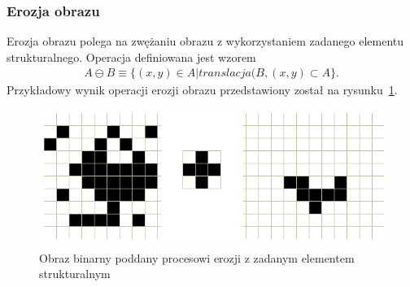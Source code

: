 \subsubsection{Erozja obrazu} 
Erozja obrazu polega na zwężaniu obrazu z wykorzystaniem zadanego elementu strukturalnego. Operacja definiowana jest wzorem
\begin{gather*}
  A \ominus B \equiv \{ (x, y) \in A | translacja(B, (x, y) \subset A \}.
\end{gather*}
Przykładowy wynik operacji erozji obrazu przedstawiony został na rysunku~\ref{fig:erode}.
\begin{figure}
  \centering
  \includegraphics[width=15cm]{img/erode}
  \caption{Obraz binarny poddany procesowi erozji z zadanym elementem strukturalnym}
  \label{fig:erode}
\end{figure}
